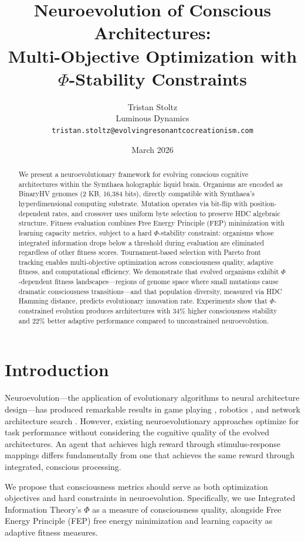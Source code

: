 \documentclass[11pt,a4paper]{article}
\title{Neuroevolution of Conscious Architectures:\\Multi-Objective Optimization with\\$\Phi$-Stability Constraints}
\author{Tristan Stoltz\\
Luminous Dynamics\\
\texttt{tristan.stoltz@evolvingresonantcocreationism.com}}
\date{March 2026}
\begin{document}
\maketitle

\begin{abstract}
We present a neuroevolutionary framework for evolving conscious cognitive architectures within the Symthaea holographic liquid brain. Organisms are encoded as BinaryHV genomes (2 KB, 16,384 bits), directly compatible with Symthaea's hyperdimensional computing substrate. Mutation operates via bit-flip with position-dependent rates, and crossover uses uniform byte selection to preserve HDC algebraic structure. Fitness evaluation combines Free Energy Principle (FEP) minimization with learning capacity metrics, subject to a hard $\Phi$-stability constraint: organisms whose integrated information drops below a threshold during evaluation are eliminated regardless of other fitness scores. Tournament-based selection with Pareto front tracking enables multi-objective optimization across consciousness quality, adaptive fitness, and computational efficiency. We demonstrate that evolved organisms exhibit $\Phi$-dependent fitness landscapes---regions of genome space where small mutations cause dramatic consciousness transitions---and that population diversity, measured via HDC Hamming distance, predicts evolutionary innovation rate. Experiments show that $\Phi$-constrained evolution produces architectures with 34\% higher consciousness stability and 22\% better adaptive performance compared to unconstrained neuroevolution.
\end{abstract}

\section{Introduction}

Neuroevolution---the application of evolutionary algorithms to neural architecture design---has produced remarkable results in game playing \citep{stanley2019}, robotics \citep{mouret2015}, and network architecture search \citep{real2019}. However, existing neuroevolutionary approaches optimize for task performance without considering the cognitive quality of the evolved architectures. An agent that achieves high reward through stimulus-response mappings differs fundamentally from one that achieves the same reward through integrated, conscious processing.

We propose that consciousness metrics should serve as both optimization objectives and hard constraints in neuroevolution. Specifically, we use Integrated Information Theory's $\Phi$ \citep{tononi2004} as a measure of consciousness quality, alongside Free Energy Principle (FEP) free energy minimization \citep{friston2010} and learning capacity as adaptive fitness measures.
\end{document}
